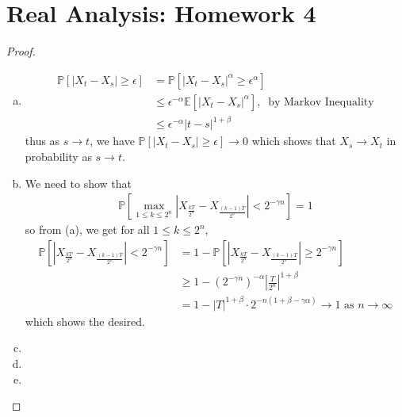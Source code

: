 \documentclass[a4paper,12pt]{article}
\theoremstyle{definition}
\begin{document}
\section*{Real Analysis: Homework 4}


\begin{proof}
\hspace{1em}
\begin{enumerate}[(a)]
\item  
\begin{align*}
\mathbb{P}[|X_t-X_s|\geq \epsilon] &= \mathbb{P}[|X_t-X_s|^\alpha\geq \epsilon^\alpha]\\
&\leq \epsilon^{-\alpha}\mathbb{E}[|X_t-X_s|^\alpha],~ \text{ by Markov Inequality}\\
& \leq  \epsilon^{-\alpha}|t-s|^{1+\beta}
\end{align*}
thus as $s \to t$, we have $\mathbb{P}[|X_t-X_s|\geq \epsilon] \to 0$ which shows that $X_s \to X_t$ in probability as $s \to t$.


\item We need to show that 
\begin{align*}
\mathbb{P}\left[\max_{1 \leq k \leq 2^n}\left|X_{\frac{kT}{2^n}}-X_{\frac{(k-1)T}{2^n}}\right|<2^{-\gamma n}\right]=1
\end{align*}
so from (a), we get for all $1 \leq k \leq 2^n$,
\begin{align*}
\mathbb{P}\left[\left|X_{\frac{kT}{2^n}}-X_{\frac{(k-1)T}{2^n}}\right|<2^{-\gamma n}\right] &= 1- \mathbb{P}\left[\left|X_{\frac{kT}{2^n}}-X_{\frac{(k-1)T}{2^n}}\right|\geq 2^{-\gamma n}\right]\\
& \geq 1 - (2^{-\gamma n})^{-\alpha}\left|\frac{T}{2^n}\right|^{1+\beta}\\
& = 1 - |T|^{1+\beta}\cdot 2^{-n(1+\beta-\gamma\alpha)} \to 1 \text{ as } n \to \infty 
\end{align*}
which shows the desired.

\item







\item



\item







\end{enumerate}

\end{proof}
\end{document}
